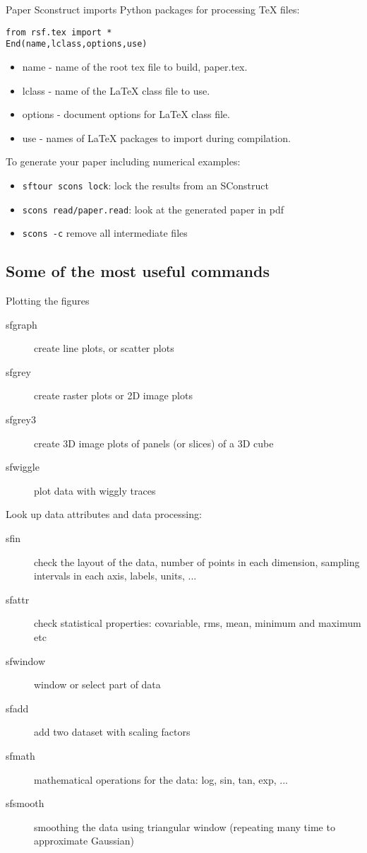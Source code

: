 Paper Sconstruct imports Python packages for processing TeX files:
\lstset{language=python,numbers=left,numberstyle=\tiny,showstringspaces=false,frame=single}
\begin{lstlisting}
from rsf.tex import * 
End(name,lclass,options,use)
\end{lstlisting}
  \begin{itemize}
    \item name - name of the root tex file to build, paper.tex.
    \item lclass - name of the LaTeX class file to use.
    \item options - document options for LaTeX class file.
    \item use - names of LaTeX packages to import during compilation.
  \end{itemize}
To generate your paper including numerical examples:
 \begin{itemize}
  \item \texttt{sftour scons lock}: lock the results from an SConstruct
  \item \texttt{scons read/paper.read}:	look at the generated paper in pdf
  \item \texttt{scons -c} remove all intermediate files
 \end{itemize}
 
\subsection{Some of the most useful commands}

  Plotting the figures
    \begin{description}
      \item[sfgraph]	create line plots, or scatter plots
      \item[sfgrey] 	create raster plots or 2D image plots
      \item[sfgrey3] 	create 3D image plots of panels (or slices) of a 3D cube
      \item[sfwiggle] 	plot data with wiggly traces 
    \end{description}
    
  Look up data attributes and data processing:
  \begin{description}
   \item[sfin] check the layout of the data, number of points in each dimension, sampling intervals in each axis, labels, units, ...
   \item[sfattr] check statistical properties: covariable, rms, mean, minimum and maximum etc
   \item[sfwindow] window or select part of data
   \item[sfadd] add two dataset with scaling factors
   \item[sfmath] mathematical operations for the data: log, sin, tan, exp, ...
   \item[sfsmooth] smoothing the data using triangular window (repeating many time to approximate Gaussian)
  \end{description}

